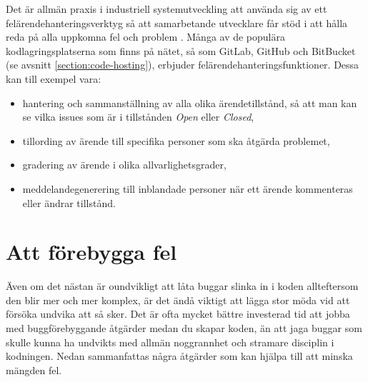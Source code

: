 Det är allmän praxis i industriell systemutveckling att använda sig av ett felärendehanteringsverktyg  så att samarbetande utvecklare får stöd i att hålla reda på alla uppkomna fel och problem . Många av de populära kodlagringsplatserna som finns på nätet, så som GitLab, GitHub och BitBucket (se avsnitt \ref{section:code-hosting}), erbjuder felärendehanteringsfunktioner. Dessa kan till exempel vara:
\begin{itemize}
\item hantering och sammanställning av alla olika ärendetillstånd, så att man kan se vilka issues som är i tillstånden \textit{Open} eller \textit{Closed},
\item tillording av ärende till specifika personer som ska åtgärda problemet,
\item gradering av ärende i olika allvarlighetsgrader,
\item meddelandegenerering till inblandade personer när ett ärende kommenteras eller ändrar tillstånd.
\end{itemize}


\section{Att förebygga fel}

Även om det nästan är oundvikligt att låta buggar slinka in i koden allteftersom den blir mer och mer komplex, är det ändå viktigt att lägga stor möda vid att försöka undvika att så sker. Det är ofta mycket bättre investerad tid att jobba med buggförebyggande åtgärder medan du skapar koden, än att jaga buggar som skulle kunna ha undvikts med allmän noggrannhet och stramare disciplin i kodningen. Nedan sammanfattas några åtgärder som kan hjälpa till att minska mängden fel.

